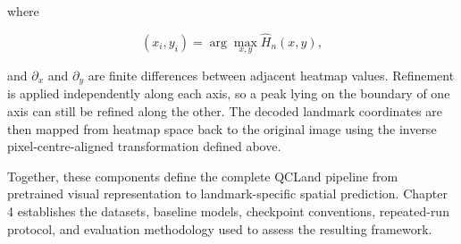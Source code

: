 where

\[
(x_i,y_i)
=
\arg\max_{x,y}
\hat{H}_n(x,y),
\]

and $\partial_x$ and $\partial_y$ are finite differences between
adjacent heatmap values. Refinement is applied independently along
each axis, so a peak lying on the boundary of one axis can still be
refined along the other. The decoded landmark coordinates are then
mapped from heatmap space back to the original image using the inverse
pixel-centre-aligned transformation defined above.

Together, these components define the complete QCLand pipeline from
pretrained visual representation to landmark-specific spatial
prediction. Chapter 4 establishes the datasets, baseline models,
checkpoint conventions, repeated-run protocol, and evaluation
methodology used to assess the resulting framework.

